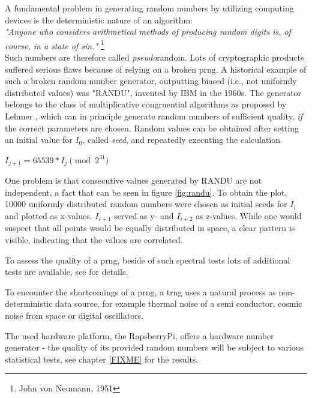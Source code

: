 A fundamental problem in generating random numbers by utilizing computing devices is the deterministic nature of an algorithm:
\\

\textit{"Anyone who considers arithmetical methods of producing random digits is, of course, in a state of sin."} \footnote{John von Neumann, 1951}
\\

Such numbers are therefore called \textit{pseudo}random. Lots of cryptographic products suffered serious flaws because of relying on a broken \gls{prng}. A 
historical example of such a broken random number generator, outputting biased (i.e., not uniformly distributed values) was "RANDU", invented by IBM in the
1960s. 
The generator belongs to the class of multiplicative congruential algorithms as proposed by Lehmer \cite{MR0044899}, which can in principle generate random
numbers of sufficient quality, \textit{if} the correct parameters are chosen.
Random values can be obtained after setting an initial value for $I_0$, called \textit{seed}, and repeatedly executing the calculation

\begin{center}
 $I_{j+1} = 65539 * I_j \pmod{2^{31}}$
\end{center}

One problem 
is that consecutive values generated by RANDU are not independent, a fact that	 can be seen in figure \ref{fig:randu}. To obtain the plot, 10000 uniformly distributed 
random numbers were chosen as initial seeds for $I_i$ and plotted as x-values. $I_{i+1}$ served as y- and $I_{i+2}$ as z-values. While one would suspect that all points
would be equally distributed in space, a clear pattern is visible, indicating that the values are correlated.

To assess the quality of a \gls{prng}, beside of such spectral tests lots of additional tests are available, see \cite{nistRAND} for details.

To encounter the shortcomings of a \gls{prng}, a \gls{trng} uses a natural process as non-deterministic data source, for example
thermal noise of a semi conductor, cosmic noise from space or digital oscillators.

The used hardware platform, the RapsberryPi, offers a hardware number generator - the quality of its provided random numbers will be subject
to various statistical tests, see chapter \ref{FIXME} for the results.


